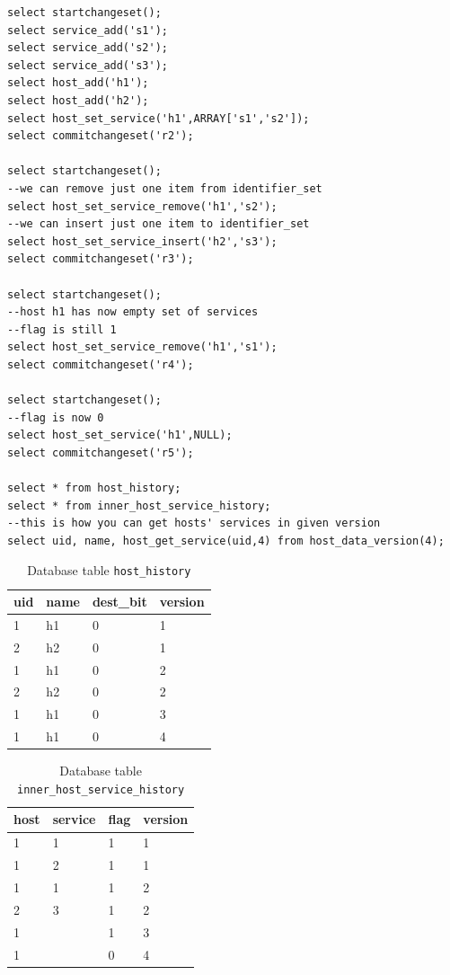 \documentclass[deska]{subfiles}
\begin{document}
\begin{verbatim}
select startchangeset();
select service_add('s1');
select service_add('s2');
select service_add('s3');
select host_add('h1');
select host_add('h2');
select host_set_service('h1',ARRAY['s1','s2']);
select commitchangeset('r2');

select startchangeset();
--we can remove just one item from identifier_set
select host_set_service_remove('h1','s2');
--we can insert just one item to identifier_set
select host_set_service_insert('h2','s3');
select commitchangeset('r3');

select startchangeset();
--host h1 has now empty set of services
--flag is still 1
select host_set_service_remove('h1','s1');
select commitchangeset('r4');

select startchangeset();
--flag is now 0
select host_set_service('h1',NULL);
select commitchangeset('r5');

select * from host_history;
select * from inner_host_service_history;
--this is how you can get hosts' services in given version
select uid, name, host_get_service(uid,4) from host_data_version(4);
\end{verbatim}

\begin{longtable}{ l | l | l | l }
    \caption{Database table {\tt host\_history}}\\
    uid & name & dest\_bit & version\\
    \hline
    \endhead
\label{tab:multi-hosthist}
    1 & h1 & 0 & 1\\
    2 & h2 & 0 & 1\\
    1 & h1 & 0 & 2\\
    2 & h2 & 0 & 2\\
    1 & h1 & 0 & 3\\
    1 & h1 & 0 & 4\\
    \hline
\end{longtable}

\begin{longtable}{ l | l | l | l }
    \caption{Database table {\tt inner\_host\_service\_history}}\\
    host & service & flag & version\\
    \hline
    \endhead
\label{tab:multi-innerhist}
    1 & 1 & 1 & 1\\
    1 & 2 & 1 & 1\\
    1 & 1 & 1 & 2\\
    2 & 3 & 1 & 2\\
    1 &  & 1 & 3\\
    1 &  & 0 & 4\\
    \hline
\end{longtable}
\end{document}
